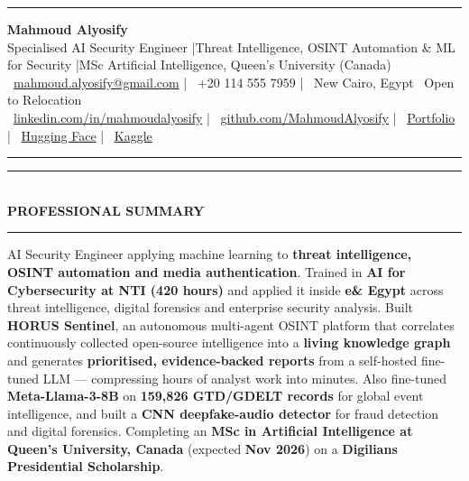 \documentclass[10pt, a4paper]{article}
\newcommand{\faEnvelope}{}\newcommand{\faPhone}{}\newcommand{\faMapMarker}{}%
\newcommand{\faLinkedin}{}\newcommand{\faGithub}{}\newcommand{\faRobot}{}%
\newcommand{\faChartBar}{}\newcommand{\faGlobe}{}%
\newcommand{\cvsection}[1]{%
  \vspace{3pt}%
  {\color{navy}\rule{\linewidth}{1.1pt}}\\[0.5pt]%
  {\color{navy}\bfseries\fontsize{9.5}{11}\selectfont\uppercase{#1}}\\[-4pt]%
  {\color{teal}\rule{\linewidth}{0.6pt}}%
  \vspace{2pt}%
}
\begin{document}
\small

{\color{navy}\rule{\linewidth}{1.5pt}}

\vspace{3pt}
\begin{center}
  {\fontsize{21}{24}\bfseries\color{navy} Mahmoud Alyosify}\\[3pt]
  {\fontsize{10}{12}\color{teal}
    Specialised AI Security Engineer \enspace|\enspace Threat Intelligence, OSINT Automation \& ML for Security
    \enspace|\enspace MSc Artificial Intelligence, Queen's University (Canada)
}\\[4pt]
  {\color{midgray}
    \faEnvelope\ \href{mailto:mahmoud.alyosify@gmail.com}{mahmoud.alyosify@gmail.com}
    \enspace|\enspace
    \faPhone\ +20 114 555 7959
    \enspace|\enspace
    \faMapMarker\ New Cairo, Egypt \textperiodcentered\ Open to Relocation}\\[2pt]
  {\faLinkedin\ \href{https://linkedin.com/in/mahmoudalyosify}{linkedin.com/in/mahmoudalyosify}
    \enspace|\enspace
    \faGithub\ \href{https://github.com/MahmoudAlyosify}{github.com/MahmoudAlyosify}
    \enspace|\enspace
    \faGlobe\ \href{https://mahmoudalyosifysite.github.io/}{Portfolio}
    \enspace|\enspace
    \faRobot\ \href{https://huggingface.co/mahmoudalyosify}{Hugging Face}
    \enspace|\enspace
    \faChartBar\ \href{https://kaggle.com/mahmoudalyosify}{Kaggle}}
\end{center}

{\color{navy}\rule{\linewidth}{1.5pt}}

\vspace{2pt}

\cvsection{Professional Summary}

{\color{darkgray}\justifying
AI Security Engineer applying machine learning to \textbf{threat intelligence, OSINT automation and media authentication}. Trained in \textbf{AI for Cybersecurity at NTI (420 hours)} and applied it inside \textbf{e\& Egypt} across threat intelligence, digital forensics and enterprise security analysis. Built \textbf{HORUS Sentinel}, an autonomous multi-agent OSINT platform that correlates continuously collected open-source intelligence into a \textbf{living knowledge graph} and generates \textbf{prioritised, evidence-backed reports} from a self-hosted fine-tuned LLM --- compressing hours of analyst work into minutes. Also fine-tuned \textbf{Meta-Llama-3-8B} on \textbf{159,826 GTD/GDELT records} for global event intelligence, and built a \textbf{CNN deepfake-audio detector} for fraud detection and digital forensics. Completing an \textbf{MSc in Artificial Intelligence at Queen's University, Canada} (expected \textbf{Nov 2026}) on a \textbf{Digilians Presidential Scholarship}.}
\end{document}
